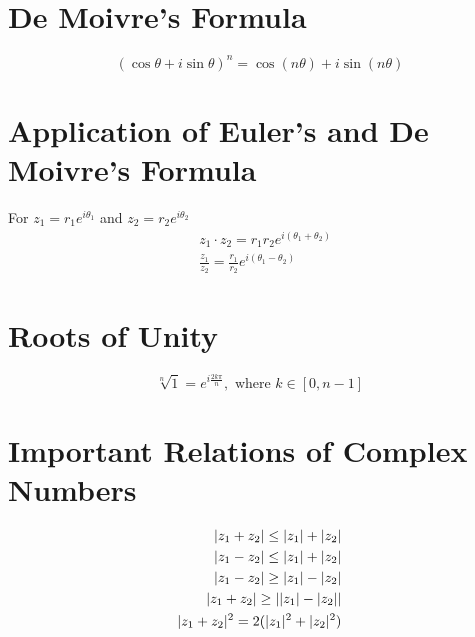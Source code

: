 \section{De Moivre's Formula}
\begin{equation}
	(\cos\theta + i\sin\theta)^n = \cos(n\theta) + i\sin(n\theta)
\end{equation}


\section{Application of Euler's and De Moivre's Formula}
For $z_1 = r_1 e^{i\theta_1}$ and $z_2 = r_2 e^{i\theta_2}$
\begin{align}
	&z_1\cdot z_2 = r_1r_2 e^{i(\theta_1+\theta_2)}\\
	&\frac{z_1}{z_2}=\frac{r_1}{r_2}e^{i(\theta_1-\theta_2)}
\end{align}


\section{Roots of Unity}
\begin{equation}
	\sqrt[n]{1}=e^{i\frac{2k\pi}{n}},\text{ where } k \in [0,n-1]
\end{equation}


\section{Important Relations of Complex Numbers}
\begin{align}
	\abs{z_1+z_2} \leq \abs{z_1} +\abs{z_2}\\
	\abs{z_1-z_2} \leq  \abs{z_1} + \abs{z_2}\\
	\abs{z_1-z_2} \geq  \abs{z_1} - \abs{z_2}\\
	\abs{z_1+z_2} \geq \abs{\abs{z_1} - \abs{z_2}}\\
	\abs{z_1+z_2}^2 = 2(\abs{z_1}^2 + \abs{z_2}^2) %
\end{align}
